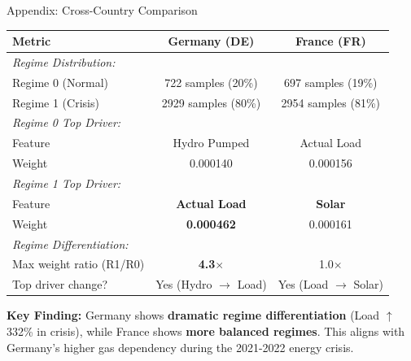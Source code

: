 \documentclass[aspectratio=169]{beamer}
\begin{document}
\begin{frame}{Appendix: Cross-Country Comparison}
\begin{table}
\centering
\scriptsize
\begin{tabular}{l|c|c}
\toprule
\textbf{Metric} & \textbf{Germany (DE)} & \textbf{France (FR)} \\
\midrule
\multicolumn{3}{l}{\textit{Regime Distribution:}} \\
\quad Regime 0 (Normal) & 722 samples (20\%) & 697 samples (19\%) \\
\quad Regime 1 (Crisis) & 2929 samples (80\%) & 2954 samples (81\%) \\
\midrule
\multicolumn{3}{l}{\textit{Regime 0 Top Driver:}} \\
\quad Feature & Hydro Pumped & Actual Load \\
\quad Weight & 0.000140 & 0.000156 \\
\midrule
\multicolumn{3}{l}{\textit{Regime 1 Top Driver:}} \\
\quad Feature & \textbf{Actual Load} & \textbf{Solar} \\
\quad Weight & \textbf{0.000462} & 0.000161 \\
\midrule
\multicolumn{3}{l}{\textit{Regime Differentiation:}} \\
\quad Max weight ratio (R1/R0) & \textbf{4.3$\times$} & 1.0$\times$ \\
\quad Top driver change? & Yes (Hydro $\rightarrow$ Load) & Yes (Load $\rightarrow$ Solar) \\
\bottomrule
\end{tabular}
\end{table}

\vspace{0.3cm}
\textbf{Key Finding:} Germany shows \textbf{dramatic regime differentiation} (Load $\uparrow$ 332\% in crisis), while France shows \textbf{more balanced regimes}. This aligns with Germany's higher gas dependency during the 2021-2022 energy crisis.
\end{frame}
\end{document}
